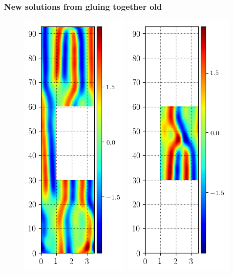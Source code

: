 \documentclass[mathserif, handout]{beamer}
\begin{document}
\begin{frame}
\frametitle{New solutions from gluing together old}
\begin{figure}
\includegraphics[width=.3\textwidth,height=.4\textheight]{MNG_ppo_without_HOD}
\includegraphics[width=.3\textwidth,height=.4\textheight]{MNG_ppo_subdomain_HOD}
\end{figure}
\end{frame}
\end{document}
